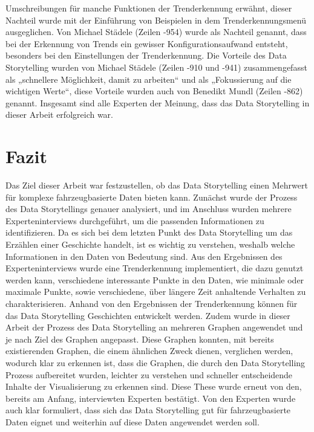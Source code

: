 Umschreibungen für manche Funktionen der Trenderkennung erwähnt, dieser Nachteil wurde mit der Einführung von Beispielen in dem Trenderkennungsmenü ausgeglichen. Von Michael Städele (Zeilen -954) wurde als Nachteil genannt, dass bei der Erkennung von Trends ein gewisser Konfigurationsaufwand entsteht, besonders bei den Einstellungen der Trenderkennung. Die Vorteile des Data Storytelling wurden von Michael Städele (Zeilen -910 und -941) zusammengefasst als „schnellere Möglichkeit, damit zu arbeiten“ und als „Fokussierung auf die wichtigen Werte“, diese Vorteile wurden auch von Benedikt Mundl (Zeilen -862) genannt. Insgesamt sind alle Experten der Meinung, dass das Data Storytelling in dieser Arbeit erfolgreich war.
\section{Fazit}
Das Ziel dieser Arbeit war festzustellen, ob das Data Storytelling einen Mehrwert für komplexe fahrzeugbasierte Daten bieten kann.
Zunächst wurde der Prozess des Data Storytellings genauer analysiert, und im Anschluss wurden mehrere Experteninterviews durchgeführt, um die passenden Informationen zu identifizieren. Da es sich bei dem letzten Punkt des Data Storytelling um das Erzählen einer Geschichte handelt, ist es wichtig zu verstehen, weshalb welche Informationen in den Daten von Bedeutung sind. Aus den Ergebnissen des Experteninterviews wurde eine Trenderkennung implementiert, die dazu genutzt werden kann, verschiedene interessante Punkte in den Daten, wie minimale oder maximale Punkte, sowie verschiedene, über längere Zeit anhaltende Verhalten zu charakterisieren. Anhand von den Ergebnissen der Trenderkennung können für das Data Storytelling Geschichten entwickelt werden. Zudem wurde in dieser Arbeit der Prozess des Data Storytelling an mehreren Graphen angewendet und je nach Ziel des Graphen angepasst. Diese Graphen konnten, mit bereits existierenden Graphen, die einem ähnlichen Zweck dienen, verglichen werden, wodurch klar zu erkennen ist, dass die Graphen, die durch den Data Storytelling Prozess aufbereitet wurden, leichter zu verstehen und schneller entscheidende Inhalte der Visualisierung zu erkennen sind. Diese These wurde erneut von den, bereits am Anfang, interviewten Experten bestätigt. Von den Experten wurde auch klar formuliert, dass sich das Data Storytelling gut für fahrzeugbasierte Daten eignet und weiterhin auf diese Daten angewendet werden soll.